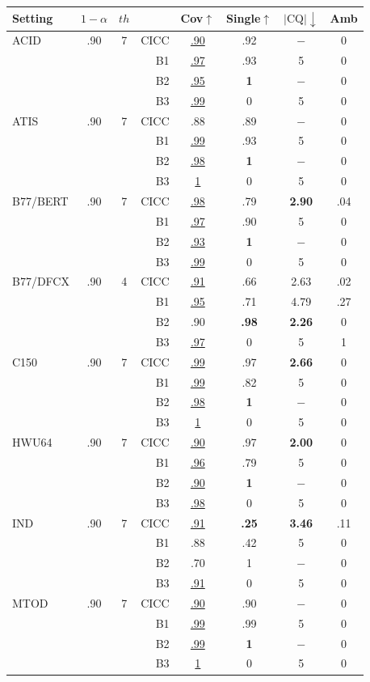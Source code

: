 \begin{table}[h!]
\centering
\footnotesize{
\setlength\tabcolsep{2pt}
\begin{tabular}{lccr|cccc}
\toprule
Setting & $1-\alpha$ & $th$ &    & Cov$\uparrow$ & Single$\uparrow$ & $|\text{CQ}|\downarrow$ & Amb \\ \midrule
ACID & .90 & 7  &  CICC & \underline{.90} & .92 & $-$ &0 \\
& & &  B1 & \underline{.97} & .93 & 5 &0 \\
& & &  B2 & \underline{.95} & \textbf{1} & $-$ &0 \\
& & &  B3 & \underline{.99} &0 & 5 &0 \\
\midrule
ATIS & .90 & 7  &  CICC & .88 & .89 & $-$ &0 \\
& & &  B1 & \underline{.99} & .93 & 5 &0 \\
& & &  B2 & \underline{.98} & \textbf{1} & $-$ &0 \\
& & &  B3 & \underline{1} &0 & 5 &0 \\
\midrule
B77/BERT & .90 & 7  &  CICC & \underline{.98} & .79 & \textbf{2.90} & .04 \\
& & &  B1 & \underline{.97} & .90 & 5 &0 \\
& & &  B2 & \underline{.93} & \textbf{1} & $-$ &0 \\
& & &  B3 & \underline{.99} &0 & 5 &0 \\
\midrule
B77/DFCX & .90 & 4  &  CICC & \underline{.91} & .66 & 2.63 & .02 \\
& & &  B1 & \underline{.95} & .71 & 4.79 & .27 \\
& & &  B2 & .90 & \textbf{.98} & \textbf{2.26} &0 \\
& & &  B3 & \underline{.97} &0 & 5 & 1 \\
\midrule
C150 & .90 & 7  &  CICC & \underline{.99} & .97 & \textbf{2.66} &0 \\
& & &  B1 & \underline{.99} & .82 & 5 &0 \\
& & &  B2 & \underline{.98} & \textbf{1} & $-$ &0 \\
& & &  B3 & \underline{1} &0 & 5 &0 \\
\midrule
HWU64 & .90 & 7  &  CICC & \underline{.90} & .97 & \textbf{2.00} &0 \\
& & &  B1 & \underline{.96} & .79 & 5 &0 \\
& & &  B2 & \underline{.90} & \textbf{1} & $-$ &0 \\
& & &  B3 & \underline{.98} &0 & 5 &0 \\
\midrule
IND & .90 & 7  &  CICC & \underline{.91} & \textbf{.25} & \textbf{3.46} & .11 \\
& & &  B1 & .88 & .42 & 5 &0 \\
& & &  B2 & .70 & 1 & $-$ &0 \\
& & &  B3 & \underline{.91} &0 & 5 &0 \\
\midrule
MTOD & .90 & 7  &  CICC & \underline{.90} & .90 & $-$ &0 \\
& & &  B1 & \underline{.99} & .99 & 5 &0 \\
& & &  B2 & \underline{.99} & \textbf{1} & $-$ &0 \\
& & &  B3 & \underline{1} &0 & 5 &0 \\
 

\end{tabular}}
\end{table}
